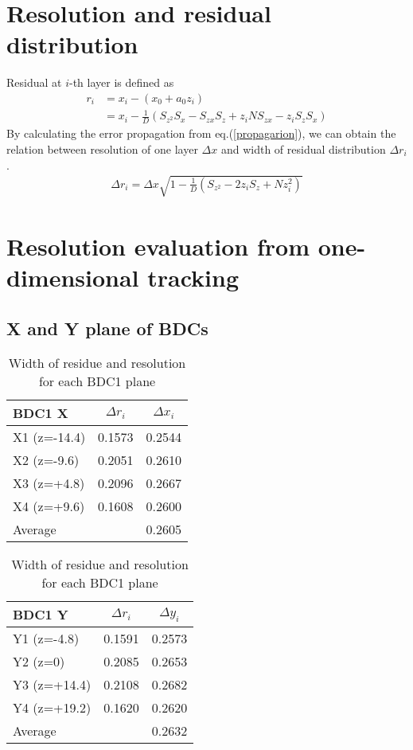 \section{Resolution and residual distribution}
Residual at $i$-th layer is defined as
\begin{align}
    r_i &= x_i - (x_0 + a_0 z_i) \\
        &= x_i - \frac{1}{D}(S_{z^2} S_x - S_{zx} S_z + z_i N S_{zx} - z_i S_z S_x)
\end{align}
By calculating the error propagation from eq.(\ref{propagarion}), we can obtain the relation between resolution of one layer $\Delta x$ and width of residual distribution $\Delta r_i$.
\begin{align}
    \Delta r_i = \Delta x \sqrt{1 - \frac{1}{D} (S_{z^2} - 2z_i S_z + N z_i^2)}
\end{align}

\section{Resolution evaluation from one-dimensional tracking}

\subsection{X and Y plane of BDCs}
\begin{table}[h]
\centering
    \begin{tabular}{l|cc}
    \hline
    BDC1 X  & $\Delta r_i$ & $\Delta x_i$     \\
    \hline
    X1 (z=-14.4)& 0.1573 & 0.2544      \\
    X2 (z=-9.6) & 0.2051 & 0.2610      \\
    X3 (z=+4.8) & 0.2096 & 0.2667      \\
    X4 (z=+9.6) & 0.1608 & 0.2600 \\
    \hline
        Average &        & 0.2605  \\
    \hline
\end{tabular}
\begin{tabular}{l|cc}
    \hline
     BDC1 Y & $\Delta r_i$ & $\Delta y_i$ \\
    \hline
         Y1 (z=-4.8) & 0.1591 & 0.2573 \\
         Y2 (z=0)    & 0.2085 & 0.2653 \\
         Y3 (z=+14.4)& 0.2108 & 0.2682 \\
         Y4 (z=+19.2)& 0.1620 & 0.2620 \\
    \hline
             Average &        & 0.2632 \\
    \hline
    \end{tabular}
    \caption{Width of residue and resolution for each BDC1 plane}
\end{table}

